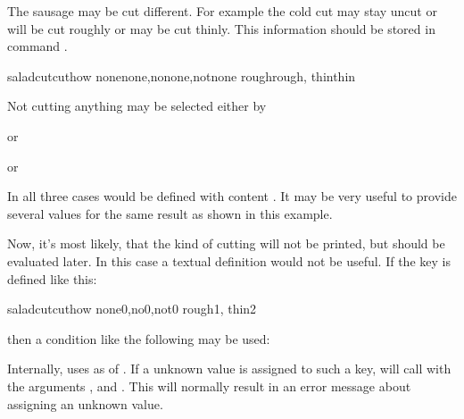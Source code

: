 \begin{Example}
  The sausage may be cut different. For example the cold cut may stay uncut or
  will be cut roughly or may be cut thinly. This information should be stored
  in command .
\begin{lstcode}
                     {saladcut}{cuthow}{%
                       {none}{none},{no}{none},{not}{none}%
                       {rough}{rough},%
                       {thin}{thin}%
                     }
\end{lstcode}
  Not cutting anything may be selected either by
\begin{lstcode}
\end{lstcode}
  or
\begin{lstcode}
\end{lstcode}
  or
\begin{lstcode}
\end{lstcode}
  In all three cases  would be defined with content
  . It may be very useful to provide several values for the same
  result as shown in this example.

  Now, it's most likely, that the kind of cutting will not be printed, but
  should be evaluated later. In this case a textual definition would not be
  useful. If the key is defined like this:
\begin{lstcode}
                     {saladcut}{cuthow}{%
                       {none}{0},{no}{0},{not}{0}%
                       {rough}{1},%
                       {thin}{2}%
                     }
\end{lstcode}
  then a condition like the following may be used:
\begin{lstcode}
  \ifcase\cuthow
  \or
  \else
  \fi
\end{lstcode}
\end{Example}
Internally,  uses  as
 of . If a unknown value is assigned to
such a key,  will call 
with the arguments ,  and . This will
normally result in an error message about assigning an unknown value.
%
%
%


